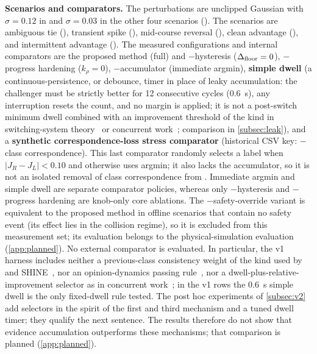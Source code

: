 \noindent\textbf{Scenarios and comparators.} The perturbations are unclipped Gaussian with $\sigma=0.12$ in  and $\sigma=0.03$ in the other four scenarios (). The scenarios are ambiguous tie (), transient spike (), mid-course reversal (), clean advantage (), and intermittent advantage (). The measured configurations and internal comparators are the proposed method (full) and $-$hysteresis ($\Delta_{\text{floor}} = 0$), $-$progress hardening ($k_\rho = 0$), $-$accumulator (immediate argmin), \textbf{simple dwell} (a continuous-persistence, or debounce, timer in place of leaky accumulation: the challenger must be strictly better for 12 consecutive cycles (0.6~s), any interruption resets the count, and no margin is applied; it is not a post-switch minimum dwell combined with an improvement threshold of the kind in switching-system theory~\citep{hespanha1999dwell} or concurrent work~\citep{li2026bigcbf}; comparison in \cref{subsec:leak}), and a \textbf{synthetic correspondence-loss stress comparator} (historical CSV key: $-$class correspondence). This last comparator randomly selects a label when $|J_R-J_L|<0.10$ and otherwise uses argmin; it also lacks the accumulator, so it is not an isolated removal of class correspondence from \sname. Immediate argmin and simple dwell are separate comparator policies, whereas only $-$hysteresis and $-$progress hardening are knob-only core ablations. The $-$safety-override variant is equivalent to the proposed method in offline scenarios that contain no safety event (its effect lies in the collision regime), so it is excluded from this measurement set; its evaluation belongs to the physical-simulation evaluation (\cref{app:planned}). No external comparator is evaluated. In particular, the v1 harness includes neither a previous-class consistency weight of the kind used by \citet{degroot2024topology} and SHINE~\citep{martinezbaselga2026shine}, nor an opinion-dynamics passing rule~\citep{cathcart2023opinion}, nor a dwell-plus-relative-improvement selector as in concurrent work~\citep{li2026bigcbf}; in the v1 rows the 0.6~s simple dwell is the only fixed-dwell rule tested. The post hoc experiments of \cref{subsec:v2} add selectors in the spirit of the first and third mechanism and a tuned dwell timer; they qualify the next sentence. The results therefore do not show that evidence accumulation outperforms these mechanisms; that comparison is planned (\cref{app:planned}).

